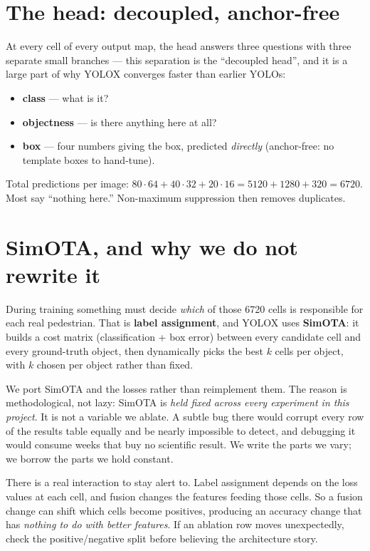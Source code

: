\documentclass[../main.tex]{subfiles}
\begin{document}
\section{The head: decoupled, anchor-free}

At every cell of every output map, the head answers three questions with three separate small
branches --- this separation is the ``decoupled head'', and it is a large part of why YOLOX
converges faster than earlier YOLOs:

\begin{itemize}
  \item \textbf{class} --- what is it?
  \item \textbf{objectness} --- is there anything here at all?
  \item \textbf{box} --- four numbers giving the box, predicted \emph{directly} (anchor-free:
        no template boxes to hand-tune).
\end{itemize}

Total predictions per image: $80{\cdot}64 + 40{\cdot}32 + 20{\cdot}16 = 5120+1280+320 = 6720$.
Most say ``nothing here.'' Non-maximum suppression then removes duplicates.

\section{SimOTA, and why we do not rewrite it}

During training something must decide \emph{which} of those 6720 cells is responsible for each
real pedestrian. That is \textbf{label assignment}, and YOLOX uses \textbf{SimOTA}: it builds a
cost matrix (classification + box error) between every candidate cell and every ground-truth
object, then dynamically picks the best $k$ cells per object, with $k$ chosen per object rather
than fixed.

We port SimOTA and the losses rather than reimplement them. The reason is methodological, not
lazy: SimOTA is \emph{held fixed across every experiment in this project}. It is not a variable
we ablate. A subtle bug there would corrupt every row of the results table equally and be nearly
impossible to detect, and debugging it would consume weeks that buy no scientific result. We
write the parts we vary; we borrow the parts we hold constant.

\begin{lesson}
There is a real interaction to stay alert to. Label assignment depends on the loss values at each
cell, and fusion changes the features feeding those cells. So a fusion change can shift which
cells become positives, producing an accuracy change that has \emph{nothing to do with better
features}. If an ablation row moves unexpectedly, check the positive/negative split before
believing the architecture story.
\end{lesson}
\end{document}
